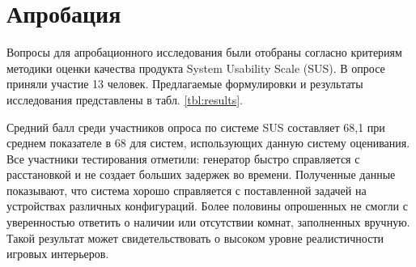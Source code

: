 
\section{Апробация}

Вопросы для апробационного исследования были отобраны согласно критериям методики оценки качества продукта System Usability Scale (SUS). В опросе приняли участие 13 человек. Предлагаемые формулировки и результаты исследования представлены в табл. \ref{tbl:results}.

Средний балл среди участников опроса по системе SUS составляет 68,1 при среднем показателе в 68 для систем, использующих данную систему оценивания. Все участники тестирования отметили: генератор быстро справляется с расстановкой и не создает больших задержек во времени. Полученные данные показывают, что система хорошо справляется с поставленной задачей на устройствах различных конфигураций. Более половины опрошенных не смогли с уверенностью ответить о наличии или отсутствии комнат, заполненных вручную. Такой результат может свидетельствовать о высоком уровне реалистичности игровых интерьеров.

\begin{landscape}
\begin{table}
\begin{center}
\caption{Апробационные вопросы и процент участников, выбравших предложенные варианты}
\label{tbl:results}
\end{center}
\end{table}
\end{landscape}